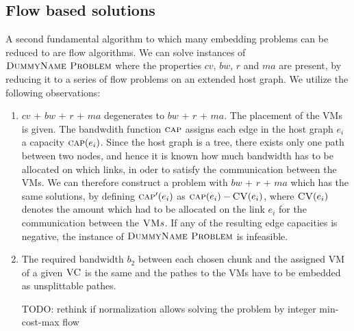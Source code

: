 \documentclass[9pt,twocolumn]{scrartcl}
\newcommand{\Capacity}{\ensuremath{\textsc{cap}}}
\newcommand{\VM}{\textsc{VM}}
\newcommand{\Problem}{\textsc{DummyName Problem}}
\newcommand{\SubstrateEdge}{\ensuremath{e}}
\newcommand{\VC}{\textsc{VC}}
\newcommand{\CostTrans}{\ensuremath{b_2}}
\begin{document}
\subsection{Flow based solutions}

A second fundamental algorithm to which many embedding problems can be reduced
to are flow algorithms. We can solve instances of $\Problem$ where the
properties $cv$, $bw$, $r$ and $ma$ are present, by reducing it to a series of
flow problems on an extended host graph. We utilize the following observations:

\newcommand{\Source}{\ensuremath{s}}
\newcommand{\Sink}{\ensuremath{t}}

\begin{enumerate}
\item $cv$ + $bw$ + $r$ + $ma$ degenerates to  $bw$ + $r$ + $ma$.
The placement of the VMs is given. The bandwdith function $\Capacity$ assigns
each edge in the host graph $\SubstrateEdge_i$ a capacity
$\Capacity(\SubstrateEdge_i)$. Since the
host graph is a tree, there exists only one path between two nodes, and hence
it is known how much bandwidth has to be allocated on which links, in oder to
satisfy the communication between the VMs. We can therefore construct a
problem with $bw$ + $r$ + $ma$ which has the same solutions, by defining
$\Capacity'(\SubstrateEdge_i)$ as
$\Capacity(\SubstrateEdge_i) - \textsc{CV}(\SubstrateEdge_i)$, where
$\textsc{CV}(\SubstrateEdge_i)$ denotes the amount which
had to be allocated on the link $\SubstrateEdge_i$ for the communication
between the $\VM s$. If any of the resulting edge capacities is negative, the
instance of $\Problem$ is infeasible.
\item The required bandwidth $\CostTrans$ between each chosen chunk and the
assigned VM of a given $\VC$ is
the same and the pathes to the VMs have to be embedded as unsplittable
pathes.

TODO: rethink if normalization allows solving the problem by integer min-cost-max flow


\end{enumerate}
\end{document}
